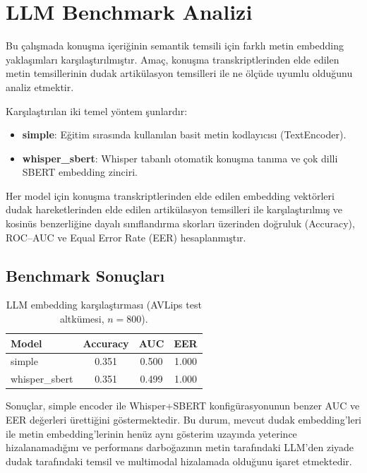 \documentclass[conference]{IEEEtran}
\begin{document}
\section{LLM Benchmark Analizi}

Bu çalışmada konuşma içeriğinin semantik temsili için farklı metin embedding yaklaşımları karşılaştırılmıştır. Amaç, konuşma transkriptlerinden elde edilen metin temsillerinin dudak artikülasyon temsilleri ile ne ölçüde uyumlu olduğunu analiz etmektir.

Karşılaştırılan iki temel yöntem şunlardır:

\begin{itemize}
  \item \textbf{simple}: Eğitim sırasında kullanılan basit metin kodlayıcısı (TextEncoder).
  \item \textbf{whisper\_sbert}: Whisper tabanlı otomatik konuşma tanıma ve çok dilli SBERT embedding zinciri.
\end{itemize}

Her model için konuşma transkriptlerinden elde edilen embedding vektörleri dudak hareketlerinden elde edilen artikülasyon temsilleri ile karşılaştırılmış ve kosinüs benzerliğine dayalı sınıflandırma skorları üzerinden doğruluk (Accuracy), ROC--AUC ve Equal Error Rate (EER) hesaplanmıştır.

\subsection{Benchmark Sonuçları}

\begin{table}[htbp]
\centering
\caption{LLM embedding karşılaştırması (AVLips test altkümesi, $n=800$).}
\begin{tabular}{lccc}
\toprule
Model & Accuracy & AUC & EER \\
\midrule
simple & 0.351 & 0.500 & 1.000 \\
whisper\_sbert & 0.351 & 0.499 & 1.000 \\
\bottomrule
\end{tabular}
\label{tab:llm_benchmark}
\end{table}

Sonuçlar, simple encoder ile Whisper+SBERT konfigürasyonunun benzer AUC ve EER değerleri ürettiğini göstermektedir. Bu durum, mevcut dudak embedding'leri ile metin embedding'lerinin henüz aynı gösterim uzayında yeterince hizalanamadığını ve performans darboğazının metin tarafındaki LLM'den ziyade dudak tarafındaki temsil ve multimodal hizalamada olduğunu işaret etmektedir.
\end{document}
